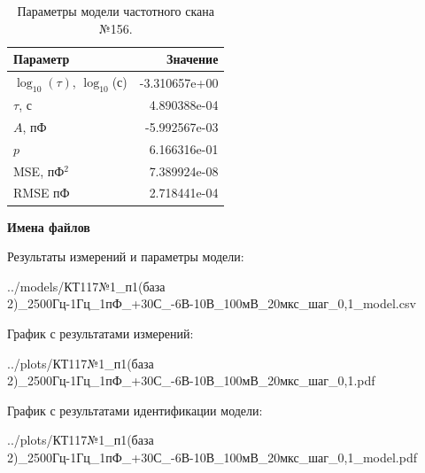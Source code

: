 \begin{table}[!ht]
    \centering
    \caption{Параметры модели частотного скана №156.}
    \begin{tabular}{|l|r|}
        \hline
        Параметр                                       & Значение                  \\ \hline
        $\log_{10}(\tau)$, $\log_{10}$(с)              & -3.310657e+00             \\ \hline
        $\tau$, с                                      & 4.890388e-04              \\ \hline
        $A$, пФ                                        & -5.992567e-03             \\ \hline
        $p$                                            & 6.166316e-01              \\ \hline
        MSE, пФ$^2$                                    & 7.389924e-08              \\ \hline
        RMSE пФ                                        & 2.718441e-04              \\ \hline
    \end{tabular}
    \label{table:frequency_scan_model_156}
\end{table}

\textbf{Имена файлов}

Результаты измерений и параметры модели:

\scriptsize../models/КТ117№1\_п1(база 2)\_2500Гц-1Гц\_1пФ\_+30С\_-6В-10В\_100мВ\_20мкс\_шаг\_0,1\_model.csv
\normalsize

График с результатами измерений:

\scriptsize../plots/КТ117№1\_п1(база 2)\_2500Гц-1Гц\_1пФ\_+30С\_-6В-10В\_100мВ\_20мкс\_шаг\_0,1.pdf
\normalsize

График с результатами идентификации модели:

\scriptsize../plots/КТ117№1\_п1(база 2)\_2500Гц-1Гц\_1пФ\_+30С\_-6В-10В\_100мВ\_20мкс\_шаг\_0,1\_model.pdf
\normalsize

